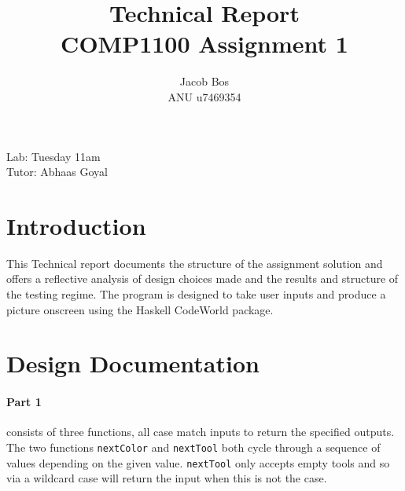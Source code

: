 \documentclass[11pt]{article}
\title{Technical Report\\ COMP1100 Assignment 1}
\author{Jacob Bos\\ ANU u7469354}
\begin{document}
\maketitle
{}
\begin{center}
  Lab: Tuesday 11am\\
  Tutor: Abhaas Goyal
\end{center}
\tableofcontents
\newpage
{}
\section{Introduction} 
This Technical report documents the structure of the assignment solution and offers a reflective analysis of design choices made and the results and structure of the testing regime. The program is designed to take user inputs and produce a picture onscreen using the Haskell CodeWorld package. %


\section{Design Documentation}%

\paragraph{Part 1} consists of three functions, all case match inputs to return the specified outputs. The two functions \verb|nextColor| and  \verb|nextTool| both cycle through a sequence of values depending on the given value.  \verb|nextTool| only accepts empty tools and so via a wildcard case will return the input when this is not the case. %
\end{document}
